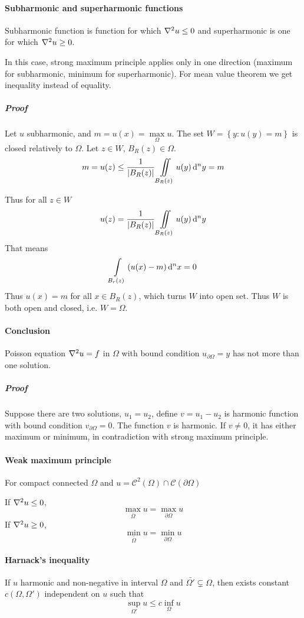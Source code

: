 	\paragraph{Subharmonic and superharmonic functions}
	Subharmonic function is function for which $\laplacian{u}\leq 0$ and superharmonic is one for which $\laplacian{u}\geq0$.
	
	In this case, strong maximum principle applies only in one direction (maximum for subharmonic, minimum for superharmonic). For mean value theorem we get inequality instead of equality.
	
	\subparagraph{Proof}
	Let $u$ subharmonic, and $m = u(x) = \max\limits_{\Omega} u$.
	The set $W= \left\{ y: u(y)=m \right\} $ is closed relatively to $\Omega$.
	Let $z\in W$, $B_R(z) \in \Omega$.
	$$m = u(z) \leq \frac{1}{\abs{B_R(z)}} \iint\limits_{B_R(z)}  u(y) \dd[n]{y} = m$$
	
	Thus for all $z\in W$
	$$u(z) = \frac{1}{\abs{B_R(z)}} \iint\limits_{B_R(z)} u(y) \dd[n]{y}$$
	That means
	$$\int\limits_{B_r(z)} \qty(u(x) - m) \dd[n]{x}= 0$$
	Thus $u(x) = m$ for all $x\in B_R(z)$, which turns $W$ into open set. Thus $W$ is both open and closed, i.e. $W=\Omega$.
	
	\paragraph{Conclusion}
	Poisson equation $\laplacian{u} = f$ in $\Omega$ with bound condition $u_{\partial \Omega} = y$ has not more than one solution.
	\subparagraph{Proof}
	Suppose there are two solutions, $u_1=u_2$, define $v=u_1-u_2$ is harmonic function with bound condition  $v_{\partial \Omega} = 0$. The function $v$ is harmonic. If $v\neq 0$, it has either maximum or minimum, in contradiction with strong maximum principle.
	
	\paragraph{Weak maximum principle}
	For compact connected $\Omega$ and $u = \mathcal{C}^2(\Omega) \cap \mathcal{C}(\partial \Omega)$ 
	
	If $\laplacian{u} \leq 0$, 
	$$\max\limits_{\bar{\Omega}} u = \max\limits_{\partial \Omega} u$$
	If $\laplacian{u} \geq 0$, 
	$$\min\limits_{\bar{\Omega}} u = \min\limits_{\partial \Omega} u$$
	\paragraph{Harnack's inequality}
	If $u$ harmonic and non-negative in interval $\Omega$ and $\bar{\Omega'} \subsetneq \Omega$, then exists constant $c(\Omega, \Omega')$ independent on $u$ such that
	$$\sup\limits_{\Omega'} u \leq c \inf\limits_{\Omega} u$$
	